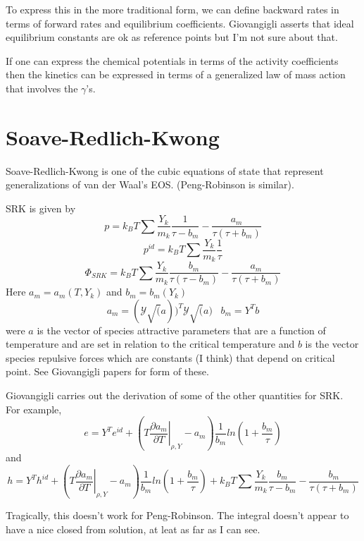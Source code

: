 \documentclass[11pt]{article}
\begin{document}
To express this in the more traditional form, we can define backward rates in terms of forward rates
and equilibrium coefficients.  Giovangigli asserts that ideal equilibrium constants are ok as 
reference points but I'm not sure about that.

If one can express the chemical potentials in terms of the activity coefficients then the 
kinetics can be expressed in terms of a generalized law of mass action that involves the $\gamma$'s.


\section{Soave-Redlich-Kwong}

Soave-Redlich-Kwong is one of the cubic equations of state that represent generalizations of
van der Waal's EOS.
(Peng-Robinson is similar).

SRK is given by
\[
p = k_B T \sum \frac{Y_k}{m_k} \frac{1}{\tau - b_m} - \frac{a_m}{\tau(\tau + b_m)}
\]
\[
p^{id} = k_B T \sum \frac{Y_k}{m_k} \frac{1}{\tau}
\]
\[
\Phi_{SRK}
= k_B T \sum \frac{Y_k}{m_k} \frac{b_m}{\tau(\tau -b_m)} - \frac{a_m}{\tau(\tau + b_m)}
\]
Here $a_m = a_m(T, Y_k)$ and $b_m = b_m(Y_k)$
\[
a_m = (\mathcal{Y}\sqrt(a))^T  \mathcal{Y}\sqrt(a) \;\;\;  b_m = Y^T b
\]
were $a$ is the vector of species attractive parameters that are a function of temperature and are
set in relation to the critical temperature and $b$ is the vector species repulsive forces which are
constants (I think) that depend on critical point.
See Giovangigli papers for form of these.

Giovangigli carries out the derivation of some of the other quantities for SRK. For example,
\[
e = Y^T e^{id} + ( T \left . \frac{\partial a_m}{\partial T} \right |_{\rho,Y} - a_m)
\frac{1}{b_m} ln ( 1 + \frac{b_m}{\tau})
\]
and
\[
h = Y^T h^{id} + ( T \left . \frac{\partial a_m}{\partial T} \right |_{\rho,Y} - a_m)
\frac{1}{b_m} ln ( 1 + \frac{b_m}{\tau})
+ 
k_B T \sum \frac{Y_k}{m_k} \frac{b_m}{\tau -b_m} - \frac{b_m}{\tau(\tau + b_m)}
\]

Tragically, this doesn't work for Peng-Robinson.  The integral doesn't appear to have a nice closed from solution, at leat as far as I can
see.
\end{document}
